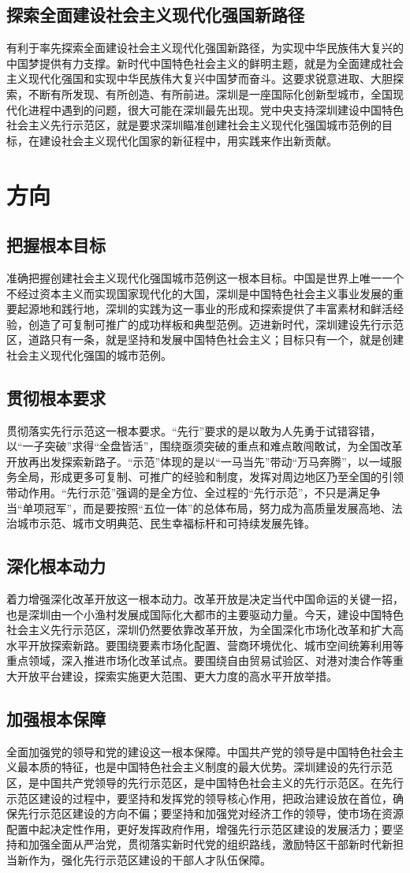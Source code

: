 \documentclass[lang=cn,11pt,a4paper]{elegantpaper}
\begin{document}
\subsection{探索全面建设社会主义现代化强国新路径}
有利于率先探索全面建设社会主义现代化强国新路径，为实现中华民族伟大复兴的中国梦提供有力支撑。新时代中国特色社会主义的鲜明主题，就是为全面建成社会主义现代化强国和实现中华民族伟大复兴中国梦而奋斗。这要求锐意进取、大胆探索，不断有所发现、有所创造、有所前进。深圳是一座国际化创新型城市，全国现代化进程中遇到的问题，很大可能在深圳最先出现。党中央支持深圳建设中国特色社会主义先行示范区，就是要求深圳瞄准创建社会主义现代化强国城市范例的目标，在建设社会主义现代化国家的新征程中，用实践来作出新贡献。

\section{方向}
\subsection{把握根本目标}
准确把握创建社会主义现代化强国城市范例这一根本目标。中国是世界上唯一一个不经过资本主义而实现国家现代化的大国，深圳是中国特色社会主义事业发展的重要起源地和践行地，深圳的实践为这一事业的形成和探索提供了丰富素材和鲜活经验，创造了可复制可推广的成功样板和典型范例。迈进新时代，深圳建设先行示范区，道路只有一条，就是坚持和发展中国特色社会主义；目标只有一个，就是创建社会主义现代化强国的城市范例。

\subsection{贯彻根本要求}
贯彻落实先行示范这一根本要求。“先行”要求的是以敢为人先勇于试错容错，以“一子突破”求得“全盘皆活”，围绕亟须突破的重点和难点敢闯敢试，为全国改革开放再出发探索新路子。“示范”体现的是以“一马当先”带动“万马奔腾”，以一域服务全局，形成更多可复制、可推广的经验和制度，发挥对周边地区乃至全国的引领带动作用。“先行示范”强调的是全方位、全过程的“先行示范”，不只是满足争当“单项冠军”，而是要按照“五位一体”的总体布局，努力成为高质量发展高地、法治城市示范、城市文明典范、民生幸福标杆和可持续发展先锋。

\subsection{深化根本动力}
着力增强深化改革开放这一根本动力。改革开放是决定当代中国命运的关键一招，也是深圳由一个小渔村发展成国际化大都市的主要驱动力量。今天，建设中国特色社会主义先行示范区，深圳仍然要依靠改革开放，为全国深化市场化改革和扩大高水平开放探索新路。要围绕要素市场化配置、营商环境优化、城市空间统筹利用等重点领域，深入推进市场化改革试点。要围绕自由贸易试验区、对港对澳合作等重大开放平台建设，探索实施更大范围、更大力度的高水平开放举措。

\subsection{加强根本保障}
全面加强党的领导和党的建设这一根本保障。中国共产党的领导是中国特色社会主义最本质的特征，也是中国特色社会主义制度的最大优势。深圳建设的先行示范区，是中国共产党领导的先行示范区，是中国特色社会主义的先行示范区。在先行示范区建设的过程中，要坚持和发挥党的领导核心作用，把政治建设放在首位，确保先行示范区建设的方向不偏；要坚持和加强党对经济工作的领导，使市场在资源配置中起决定性作用，更好发挥政府作用，增强先行示范区建设的发展活力；要坚持和加强全面从严治党，贯彻落实新时代党的组织路线，激励特区干部新时代新担当新作为，强化先行示范区建设的干部人才队伍保障。
\end{document}
